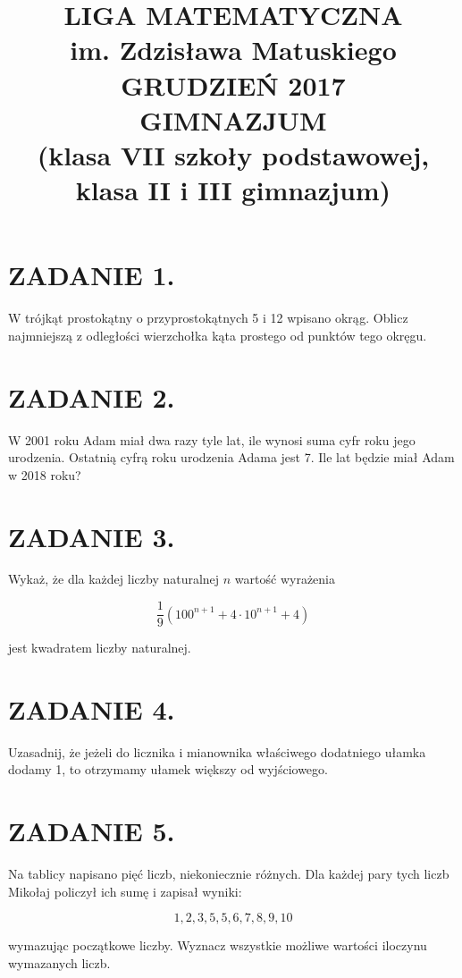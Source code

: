 \documentclass[10pt]{article}
\title{LIGA MATEMATYCZNA \\
 im. Zdzisława Matuskiego \\
 GRUDZIEŃ 2017 \\
 GIMNAZJUM \\
 (klasa VII szkoły podstawowej, klasa II i III gimnazjum) }
\author{}
\date{}
\begin{document}
\maketitle
\section*{ZADANIE 1.}
W trójkąt prostokątny o przyprostokątnych 5 i 12 wpisano okrąg. Oblicz najmniejszą z odległości wierzchołka kąta prostego od punktów tego okręgu.

\section*{ZADANIE 2.}
W 2001 roku Adam miał dwa razy tyle lat, ile wynosi suma cyfr roku jego urodzenia. Ostatnią cyfrą roku urodzenia Adama jest 7. Ile lat będzie miał Adam w 2018 roku?

\section*{ZADANIE 3.}
Wykaż, że dla każdej liczby naturalnej \(n\) wartość wyrażenia

\[
\frac{1}{9}\left(100^{n+1}+4 \cdot 10^{n+1}+4\right)
\]

jest kwadratem liczby naturalnej.

\section*{ZADANIE 4.}
Uzasadnij, że jeżeli do licznika i mianownika właściwego dodatniego ułamka dodamy 1, to otrzymamy ułamek większy od wyjściowego.

\section*{ZADANIE 5.}
Na tablicy napisano pięć liczb, niekoniecznie różnych. Dla każdej pary tych liczb Mikołaj policzył ich sumę i zapisał wyniki:

\[
1,2,3,5,5,6,7,8,9,10
\]

wymazując początkowe liczby. Wyznacz wszystkie możliwe wartości iloczynu wymazanych liczb.
\end{document}
